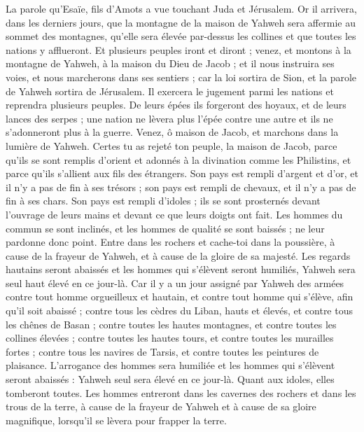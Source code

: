 \begin{multicols}{2}
\VerseOne{}La parole qu'Esaïe, fils d'Amots a vue touchant Juda et Jérusalem.
Or il arrivera, dans les derniers jours, que la montagne de la maison de Yahweh sera affermie au  sommet des montagnes, qu'elle sera élevée par-dessus les collines et que toutes les nations y afflueront.
Et plusieurs peuples iront et diront ; venez, et montons à la montagne de Yahweh, à la maison du Dieu de Jacob ; et il nous instruira ses voies, et nous marcherons dans ses sentiers ; car la loi sortira de Sion, et la parole de Yahweh sortira de Jérusalem. 
Il exercera le jugement parmi les nations et reprendra plusieurs peuples. De leurs épées ils forgeront des hoyaux, et de leurs lances des serpes ; une nation ne lèvera plus l'épée contre une autre et ils ne s'adonneront plus à la guerre.
Venez, ô maison de Jacob, et marchons dans la lumière de Yahweh.
Certes tu as rejeté ton peuple, la maison de Jacob, parce qu'ils se sont remplis d'orient et adonnés à la divination comme les Philistins, et parce qu'ils s'allient aux fils des étrangers.
Son pays est rempli d'argent et d'or, et il n'y a pas de fin à ses trésors ; son pays est rempli de chevaux, et il n'y a pas de fin à ses chars.
Son pays est rempli d'idoles ; ils se sont prosternés devant l'ouvrage de leurs mains et devant ce que leurs doigts ont fait.
Les hommes du commun se sont inclinés, et les hommes de qualité se sont baissés ; ne leur pardonne donc point.
Entre dans les rochers et cache-toi dans la poussière, à cause de la frayeur de Yahweh, et à cause de la gloire de sa majesté.
Les regards hautains seront abaissés et les hommes qui s'élèvent seront humiliés, Yahweh sera seul haut élevé en ce jour-là.
Car il y a un jour assigné par Yahweh des armées contre tout homme orgueilleux et hautain, et contre tout homme qui s'élève, afin qu'il soit abaissé ;
contre tous les cèdres du Liban, hauts et élevés, et contre tous les chênes de Basan ;
contre toutes les hautes montagnes, et contre toutes les collines élevées ;
contre toutes les hautes tours, et contre toutes les murailles fortes ;
contre tous les navires de Tarsis, et contre toutes les peintures de plaisance.
L'arrogance des hommes sera humiliée et les hommes qui s'élèvent seront abaissés :
Yahweh seul sera élevé en ce jour-là. Quant aux idoles, elles tomberont toutes.
Les hommes entreront dans les cavernes des rochers et dans les trous de la terre, à cause de la frayeur de Yahweh et à cause de sa gloire magnifique, lorsqu'il se lèvera pour frapper la terre.

\end{multicols}
